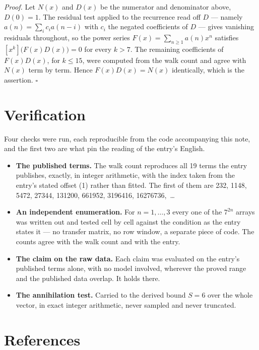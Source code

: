 \documentclass[11pt]{article}
\theoremstyle{definition}
\begin{document}
{\itshape Proof.} Let $N(x)$ and $D(x)$ be the numerator and denominator above, $D(0)=1$. The residual test applied to the recurrence read off $D$ --- namely $a(n) = \sum_i c_i a(n-i)$ with $c_i$ the negated coefficients of $D$ --- gives vanishing residuals throughout, so the power series $F(x)=\sum_{n\ge 1}a(n)x^n$ satisfies $[x^k]\bigl(F(x)D(x)\bigr) = 0$ for every $k > 7$. The remaining coefficients of $F(x)D(x)$, for $k \le 15$, were computed from the walk count and agree with $N(x)$ term by term. Hence $F(x)D(x) = N(x)$ identically, which is the assertion. $\square$

\section{Verification}

Four checks were run, each reproducible from the code accompanying this note, and the first two are what pin the reading of the entry's English.

\begin{itemize}

\item {\bfseries The published terms.} The walk count reproduces all 19 terms the entry publishes, exactly, in integer arithmetic, with the index taken from the entry's stated offset (1) rather than fitted. The first of them are 232, 1148, 5472, 27344, 131200, 661952, 3196416, 16276736,~\dots

\item {\bfseries An independent enumeration.} For $n = 1,\dots,3$ every one of the $7^{2n}$ arrays was written out and tested cell by cell against the condition as the entry states it --- no transfer matrix, no row window, a separate piece of code. The counts agree with the walk count and with the entry.

\item {\bfseries The claim on the raw data.} Each claim was evaluated on the entry's published terms alone, with no model involved, wherever the proved range and the published data overlap. It holds there.

\item {\bfseries The annihilation test.} Carried to the derived bound $S = 6$ over the whole vector, in exact integer arithmetic, never sampled and never truncated.

\end{itemize}

\section{References}
\end{document}
